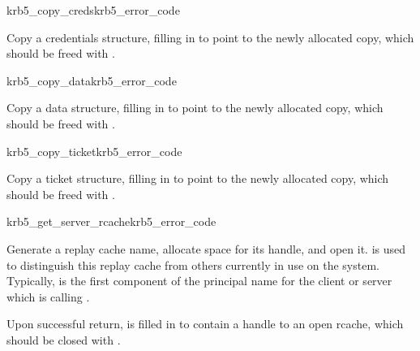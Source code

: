 \begin{funcdecl}{krb5_copy_creds}{krb5_error_code}{\funcinout}
\funcin
{}
\funcout
{}
\end{funcdecl}

Copy a credentials structure, filling in  to point
to the newly allocated copy, which should be freed with
.

\begin{funcdecl}{krb5_copy_data}{krb5_error_code}{\funcinout}
\funcin
{}
\funcout
{}
\end{funcdecl}

Copy a data structure, filling in  to point to the
newly allocated copy, which should be freed with .

\begin{funcdecl}{krb5_copy_ticket}{krb5_error_code}{\funcinout}
\funcin
{}
\funcout
{}
\end{funcdecl}

Copy a ticket structure, filling in  to point to
the newly allocated copy, which should be freed with
.


\begin{funcdecl}{krb5_get_server_rcache}{krb5_error_code}{\funcinout}
\funcin
{}
\funcout
{}
\end{funcdecl}

Generate a replay cache name, allocate space for its handle, and open
it.   is used to distinguish this replay cache from
others currently in use on the system.  Typically, 
is the first component of the principal name for the client or server
which is calling .

Upon successful return,  is filled in to contain a
handle to an open rcache, which should be closed with
.


